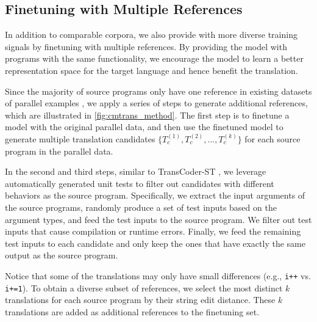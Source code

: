 \subsection{Finetuning with Multiple References}
\label{sec:multiref}
In addition to comparable corpora, we also provide \cmtransours with more diverse training signals by finetuning with multiple references. 
By providing the model with programs with the same functionality, we encourage the model to learn a better representation space for the target language and hence benefit the translation.

Since the majority of source programs only have one reference in existing datasets of parallel examples \cite{avatar}, we apply a series of steps to generate additional references, which are illustrated in \autoref{fig:cmtrans_method}.
The first step is to finetune a model with the original parallel data, and then use the finetuned model to generate multiple translation candidates $\{ T_c^{(1)}, T_c^{(2)}, ..., T_c^{(k)} \}$ for each source program in the parallel data.

In the second and third steps, similar to TransCoder-ST \cite{transcoderST}, we leverage automatically generated unit tests to filter out candidates with different behaviors as the source program.
Specifically, we extract the input arguments of the source programs, randomly produce a set of test inputs based on the argument types, and feed the test inputs to the source program.
We filter out test inputs that cause compilation or runtime errors.
Finally, we feed the remaining test inputs to each candidate and only keep the ones that have exactly the same output as the source program.

Notice that some of the translations may only have small differences (e.g., \texttt{i++} vs. \texttt{i+=1}). To obtain a diverse subset of references, we select the most distinct $k$ translations for each source program by their string edit distance.
These $k$ translations are added as additional references to the finetuning set.




